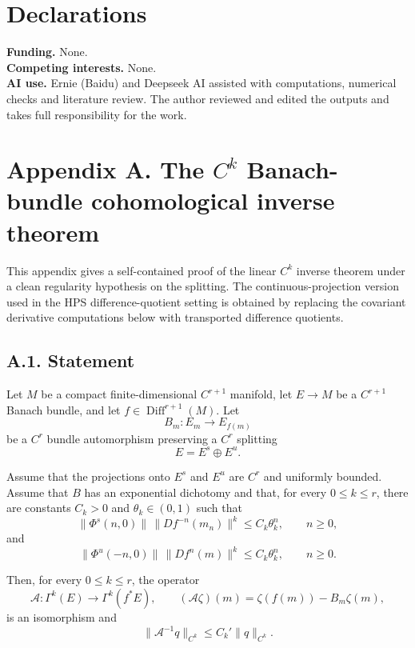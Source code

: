 \documentclass[12pt,a4paper]{article}
\theoremstyle{plain}
\numberwithin{equation}{section}
\numberwithin{theorem}{section}
\begin{document}
\section*{Declarations}

\noindent \textbf{Funding.} None. \\
\textbf{Competing interests.} None. \\
\textbf{AI use.} Ernie (Baidu) and Deepseek AI assisted with computations, numerical checks and literature review. 
The author reviewed and edited the outputs and takes full responsibility for the work.

\clearpage

\section{Appendix A. The $C^k$ Banach-bundle cohomological inverse theorem}

This appendix gives a self-contained proof of the linear $C^k$ inverse theorem under a clean regularity hypothesis on the splitting. 
The continuous-projection version used in the HPS difference-quotient setting is obtained by replacing the covariant derivative computations below with transported difference quotients.

\subsection{A.1. Statement}

Let $M$ be a compact finite-dimensional $C^{r+1}$ manifold, let $E\to M$ be a $C^{r+1}$ Banach bundle, and let $f\in\operatorname{Diff}^{r+1}(M)$. Let
\[
B_m:E_m\to E_{f(m)}
\]
be a $C^r$ bundle automorphism preserving a $C^r$ splitting
\[
E=E^s\oplus E^u.
\]

Assume that the projections onto $E^s$ and $E^u$ are $C^r$ and uniformly bounded. Assume that $B$ has an exponential dichotomy and that, for every $0\le k\le r$, there are constants $C_k>0$ and $\theta_k\in(0,1)$ such that
\[
\|\Phi^s(n,0)\|\,\|Df^{-n}(m_n)\|^k
\le
C_k\theta_k^n,
\qquad n\ge0,
\]
and
\[
\|\Phi^u(-n,0)\|\,\|Df^n(m)\|^k
\le
C_k\theta_k^n,
\qquad n\ge0.
\]

Then, for every $0\le k\le r$, the operator
\[
\mathcal A:\Gamma^k(E)\to\Gamma^k(f^*E),
\qquad
(\mathcal A\zeta)(m)=\zeta(f(m))-B_m\zeta(m),
\]
is an isomorphism and
\[
\|\mathcal A^{-1}q\|_{C^k}
\le
C_k'\|q\|_{C^k}.
\]
\end{document}
